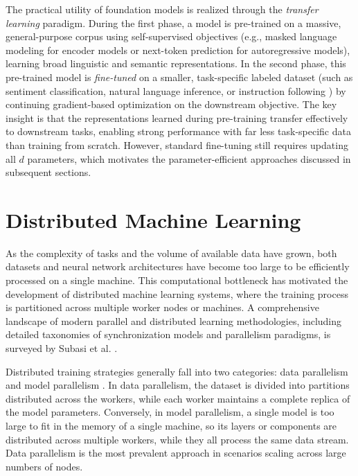 The practical utility of foundation models is realized through the \emph{transfer learning} paradigm. During the first phase, a model is pre-trained on a massive, general-purpose corpus using self-supervised objectives (e.g., masked language modeling for encoder models or next-token prediction for autoregressive models), learning broad linguistic and semantic representations. In the second phase, this pre-trained model is \emph{fine-tuned} on a smaller, task-specific labeled dataset (such as sentiment classification, natural language inference, or instruction following \cite{ouyang2022training}) by continuing gradient-based optimization on the downstream objective. The key insight is that the representations learned during pre-training transfer effectively to downstream tasks, enabling strong performance with far less task-specific data than training from scratch. However, standard fine-tuning still requires updating all $d$ parameters, which motivates the parameter-efficient approaches discussed in subsequent sections.

\section{Distributed Machine Learning}
\label{sec:distributed_ml}
As the complexity of tasks and the volume of available data have grown, both datasets and neural network architectures have become too large to be efficiently processed on a single machine. This computational bottleneck has motivated the development of distributed machine learning systems, where the training process is partitioned across multiple worker nodes or machines. A comprehensive landscape of modern parallel and distributed learning methodologies, including detailed taxonomies of synchronization models and parallelism paradigms, is surveyed by Subasi et al. \cite{subasi2023landscape}.

Distributed training strategies generally fall into two categories: data parallelism and model parallelism \cite{subasi2023landscape}. In data parallelism, the dataset is divided into partitions distributed across the workers, while each worker maintains a complete replica of the model parameters. Conversely, in model parallelism, a single model is too large to fit in the memory of a single machine, so its layers or components are distributed across multiple workers, while they all process the same data stream. Data parallelism is the most prevalent approach in scenarios scaling across large numbers of nodes.

